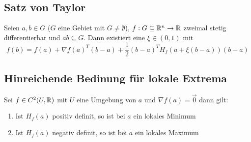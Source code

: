 \subsection{Satz von Taylor}
Seien $a, b \in G$ ($G$ eine Gebiet mit $G \neq \emptyset$), $f: G \subseteq \mathbb{R}^n
\rightarrow \mathbb{R}$ zweimal stetig differentierbar und $\overline{ab} \subseteq G$.
Dann existiert eine $\xi \in (0,1)$ mit
\begin{equation*}
    f(b) = f(a) + \nabla {f(a)}^T (b-a) + \frac{1}{2} {(b-a)}^T H_f(a+ \xi (b-a))
    (b-a)
\end{equation*}

\subsection{Hinreichende Bedinung für lokale Extrema}
Sei $f \in C^2(U, \mathbb{R})$ mit $U$ eine Umgebung von $a$ und $\nabla f(a) = \vec{0}$
dann gilt:
\begin{enumerate}[label= (\alph*)]
    \item Ist $H_f(a)$ positiv definit, so ist bei $a$ ein lokales Minimum
    \item Ist $H_f(a)$ negativ definit, so ist bei $a$ ein lokales Maximum
\end{enumerate}
